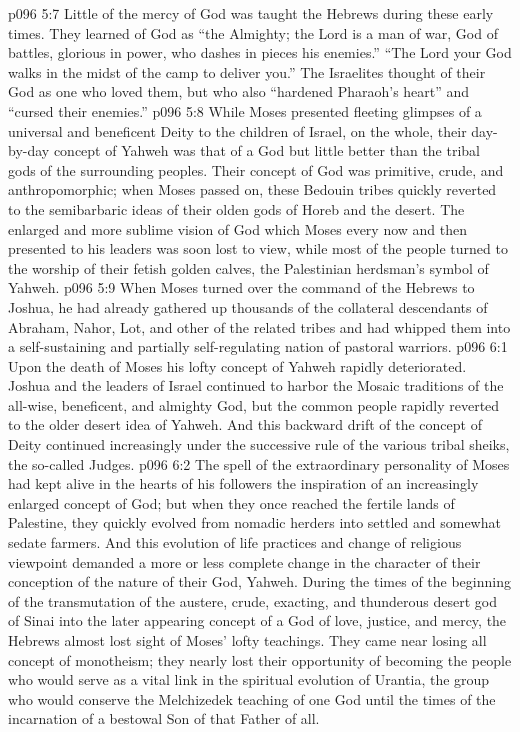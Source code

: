 \vs p096 5:7 Little of the mercy of God was taught the Hebrews during these early times. They learned of God as “the Almighty; the Lord is a man of war, God of battles, glorious in power, who dashes in pieces his enemies.” “The Lord your God walks in the midst of the camp to deliver you.” The Israelites thought of their God as one who loved them, but who also “hardened Pharaoh’s heart” and “cursed their enemies.”
\vs p096 5:8 While Moses presented fleeting glimpses of a universal and beneficent Deity to the children of Israel, on the whole, their day\hyp{}by\hyp{}day concept of Yahweh was that of a God but little better than the tribal gods of the surrounding peoples. Their concept of God was primitive, crude, and anthropomorphic; when Moses passed on, these Bedouin tribes quickly reverted to the semibarbaric ideas of their olden gods of Horeb and the desert. The enlarged and more sublime vision of God which Moses every now and then presented to his leaders was soon lost to view, while most of the people turned to the worship of their fetish golden calves, the Palestinian herdsman’s symbol of Yahweh.
\pc \vs p096 5:9 When Moses turned over the command of the Hebrews to Joshua, he had already gathered up thousands of the collateral descendants of Abraham, Nahor, Lot, and other of the related tribes and had whipped them into a self\hyp{}sustaining and partially self\hyp{}regulating nation of pastoral warriors.
\vs p096 6:1 Upon the death of Moses his lofty concept of Yahweh rapidly deteriorated. Joshua and the leaders of Israel continued to harbor the Mosaic traditions of the all\hyp{}wise, beneficent, and almighty God, but the common people rapidly reverted to the older desert idea of Yahweh. And this backward drift of the concept of Deity continued increasingly under the successive rule of the various tribal sheiks, the so\hyp{}called Judges.
\vs p096 6:2 The spell of the extraordinary personality of Moses had kept alive in the hearts of his followers the inspiration of an increasingly enlarged concept of God; but when they once reached the fertile lands of Palestine, they quickly evolved from nomadic herders into settled and somewhat sedate farmers. And this evolution of life practices and change of religious viewpoint demanded a more or less complete change in the character of their conception of the nature of their God, Yahweh. During the times of the beginning of the transmutation of the austere, crude, exacting, and thunderous desert god of Sinai into the later appearing concept of a God of love, justice, and mercy, the Hebrews almost lost sight of Moses’ lofty teachings. They came near losing all concept of monotheism; they nearly lost their opportunity of becoming the people who would serve as a vital link in the spiritual evolution of Urantia, the group who would conserve the Melchizedek teaching of one God until the times of the incarnation of a bestowal Son of that Father of all.
